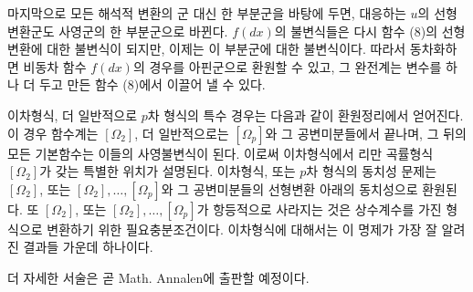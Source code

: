 마지막으로 모든 해석적 변환의 군 대신 한 부분군을 바탕에 두면, 대응하는 \(u\)의 선형변환군도 사영군의 한 부분군으로 바뀐다. \(f(dx)\)의 불변식들은 다시 함수 (8)의 선형변환에 대한 불변식이 되지만, 이제는 이 부분군에 대한 불변식이다. 따라서 동차화하면 비동차 함수 \(f(dx)\)의 경우를 아핀군으로 환원할 수 있고, 그 완전계는 변수를 하나 더 두고 만든 함수 (8)에서 이끌어 낼 수 있다.

이차형식, 더 일반적으로 \(p\)차 형식의 특수 경우는 다음과 같이 환원정리에서 얻어진다. 이 경우 함수계는 \([\Omega_2]\), 더 일반적으로는 \([\Omega_p]\)와 그 공변미분들에서 끝나며, 그 뒤의 모든 기본함수는 이들의 사영불변식이 된다. 이로써 이차형식에서 리만 곡률형식 \([\Omega_2]\)가 갖는 특별한 위치가 설명된다. 이차형식, 또는 \(p\)차 형식의 동치성 문제는 \([\Omega_2]\), 또는 \([\Omega_2],\ldots,[\Omega_p]\)와 그 공변미분들의 선형변환 아래의 동치성으로 환원된다. 또 \([\Omega_2]\), 또는 \([\Omega_2],\ldots,[\Omega_p]\)가 항등적으로 사라지는 것은 상수계수를 가진 형식으로 변환하기 위한 필요충분조건이다. 이차형식에 대해서는 이 명제가 가장 잘 알려진 결과들 가운데 하나이다.

더 자세한 서술은 곧 Math. Annalen에 출판할 예정이다.
